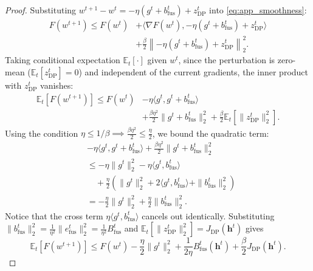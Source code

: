 \documentclass[5p,times]{elsarticle}
\theoremstyle{plain}
\theoremstyle{definition}
\theoremstyle{remark}
\begin{document}
\begin{proof}
Substituting $w^{t+1} - w^t = -\eta(g^t + b_{\mathrm{fus}}^t) + z_{\mathrm{DP}}^t$ into \eqref{eq:app_smoothness}:
\begin{equation}
\begin{aligned}
F(w^{t+1}) \le F(w^t) &+ \langle \nabla F(w^t), -\eta(g^t + b_{\mathrm{fus}}^t) + z_{\mathrm{DP}}^t \rangle \\
&+ \frac{\beta}{2}\left\|-\eta(g^t + b_{\mathrm{fus}}^t) + z_{\mathrm{DP}}^t\right\|_2^2.
\end{aligned}
\end{equation}
Taking conditional expectation $\mathbb E_t[\cdot]$ given $w^t$, since the perturbation is zero-mean ($\mathbb E_t[z_{\mathrm{DP}}^t] = 0$) and independent of the current gradients, the inner product with $z_{\mathrm{DP}}^t$ vanishes:
\begin{equation}
\begin{aligned}
\mathbb E_t[F(w^{t+1})] \le F(w^t) &- \eta \langle g^t, g^t + b_{\mathrm{fus}}^t \rangle \\
&+ \frac{\beta\eta^2}{2}\|g^t + b_{\mathrm{fus}}^t\|_2^2 + \frac{\beta}{2}\mathbb E_t[\|z_{\mathrm{DP}}^t\|_2^2].
\end{aligned}
\end{equation}
Using the condition $\eta \le 1/\beta \implies \frac{\beta\eta^2}{2} \le \frac{\eta}{2}$, we bound the quadratic term:
\begin{equation}
\begin{aligned}
&-\eta \langle g^t, g^t + b_{\mathrm{fus}}^t \rangle + \frac{\beta\eta^2}{2}\|g^t + b_{\mathrm{fus}}^t\|_2^2 \\
&\le -\eta \|g^t\|_2^2 - \eta \langle g^t, b_{\mathrm{fus}}^t \rangle \\
&\quad + \frac{\eta}{2}\left(\|g^t\|_2^2 + 2\langle g^t, b_{\mathrm{fus}}^t \rangle + \|b_{\mathrm{fus}}^t\|_2^2\right) \\
&= - \frac{\eta}{2}\|g^t\|_2^2 + \frac{\eta}{2}\|b_{\mathrm{fus}}^t\|_2^2.
\end{aligned}
\end{equation}
Notice that the cross term $\eta \langle g^t, b_{\mathrm{fus}}^t \rangle$ cancels out identically. 
Substituting $\|b_{\mathrm{fus}}^t\|_2^2 = \frac{1}{\eta^2}\|e_{\mathrm{fus}}^t\|_2^2 = \frac{1}{\eta^2}B_{\mathrm{fus}}^t$ and $\mathbb E_t[\|z_{\mathrm{DP}}^t\|_2^2] = J_{\mathrm{DP}}(\mathbf h^t)$ gives
\begin{equation}
\mathbb E_t[F(w^{t+1})] \le F(w^t) - \frac{\eta}{2}\|g^t\|_2^2 + \frac{1}{2\eta}B_{\mathrm{fus}}^t(\mathbf h^t) + \frac{\beta}{2}J_{\mathrm{DP}}(\mathbf h^t).

\end{equation}
\end{proof}
\end{document}
